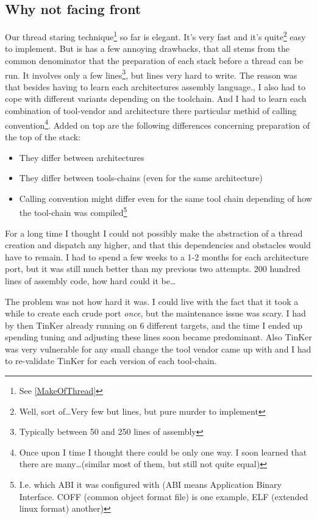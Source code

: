 {	\subsection{Why not facing front}
		Our thread staring technique\footnote{See \ref{MakeOfThread}} so far is elegant. It's very fast and it's quite\footnote{Well, sort of\ldots Very few but lines, but pure murder to implement} easy to implement. But is has a few annoying drawbacks, that all stems from the common denominator that the preparation of each stack before a thread can be run. It involves only a few lines\footnote{Typically between 50 and 250 lines of assembly}, but lines very hard to write. The reason was that besides having to learn each architectures assembly language., I also had to cope with different variants depending on the toolchain. And I had to learn each combination of tool-vendor and architecture there particular methid of calling convention\footnote{Once upon I time I thought there could be only one way. I soon learned that there are many\ldots (similar most of them, but still not quite equal)}. Added on top are the following differences concerning preparation of the top of the stack:
		\begin{itemize}
			\item They differ between architectures
			\item They differ between tools-chains (even for the same architecture)
			\item Calling convention might differ even for the same tool chain depending of how the tool-chain was compiled\footnote{I.e. which ABI it was configured with (ABI means Application Binary Interface. COFF (common object format file) is one example, ELF (extended linux format) another)}
		\end{itemize}
		For a long time I thought I could not possibly make the abstraction of a thread creation and dispatch any higher, and that this dependencies and obstacles would have to remain. I had to spend a few weeks to a 1-2 months for each architecture port, but it was still much better than my previous two attempts. 200 hundred lines of assembly code, how hard could it be\ldots

		The problem was not how hard it was. I could live with the fact that it took a while to create each crude port \textit{once}, but the maintenance issue was scary. I had by then TinKer already running on 6 different targets, and the time I ended up spending tuning and adjusting these lines soon became predominant. Also TinKer was very vulnerable for any small change the tool vendor came up with and I had to re-validate TinKer for each version of each tool-chain.

}
